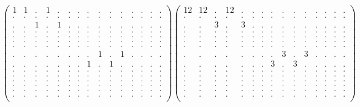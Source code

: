 \documentclass[12pt,a4paper]{amsart}
\begin{document}
\begin{align*}
\left(\begin{array}{rrrrrrrrrrrrrrr}%
1&1&.&1&.&.&.&.&.&.&.&.&.&.&.\\%
.&.&.&.&.&.&.&.&.&.&.&.&.&.&.\\%
.&.&1&.&1&.&.&.&.&.&.&.&.&.&.\\%
.&.&.&.&.&.&.&.&.&.&.&.&.&.&.\\%
.&.&.&.&.&.&.&.&.&.&.&.&.&.&.\\%
.&.&.&.&.&.&.&.&.&.&.&.&.&.&.\\%
.&.&.&.&.&.&.&.&.&.&.&.&.&.&.\\%
.&.&.&.&.&.&.&.&1&.&1&.&.&.&.\\%
.&.&.&.&.&.&.&1&.&1&.&.&.&.&.\\%
.&.&.&.&.&.&.&.&.&.&.&.&.&.&.\\%
.&.&.&.&.&.&.&.&.&.&.&.&.&.&.\\%
.&.&.&.&.&.&.&.&.&.&.&.&.&.&.\\%
.&.&.&.&.&.&.&.&.&.&.&.&.&.&.\\%
.&.&.&.&.&.&.&.&.&.&.&.&.&.&.\\%
.&.&.&.&.&.&.&.&.&.&.&.&.&.&.\\%
\end{array}\right)%
\left(\begin{array}{rrrrrrrrrrrrrrr}%
12&12&.&12&.&.&.&.&.&.&.&.&.&.&.\\%
.&.&.&.&.&.&.&.&.&.&.&.&.&.&.\\%
.&.&3&.&3&.&.&.&.&.&.&.&.&.&.\\%
.&.&.&.&.&.&.&.&.&.&.&.&.&.&.\\%
.&.&.&.&.&.&.&.&.&.&.&.&.&.&.\\%
.&.&.&.&.&.&.&.&.&.&.&.&.&.&.\\%
.&.&.&.&.&.&.&.&.&.&.&.&.&.&.\\%
.&.&.&.&.&.&.&.&3&.&3&.&.&.&.\\%
.&.&.&.&.&.&.&3&.&3&.&.&.&.&.\\%
.&.&.&.&.&.&.&.&.&.&.&.&.&.&.\\%
.&.&.&.&.&.&.&.&.&.&.&.&.&.&.\\%
.&.&.&.&.&.&.&.&.&.&.&.&.&.&.\\%
.&.&.&.&.&.&.&.&.&.&.&.&.&.&.\\%
.&.&.&.&.&.&.&.&.&.&.&.&.&.&.\\%
.&.&.&.&.&.&.&.&.&.&.&.&.&.&.\\%
\end{array}\right)%
\end{align*}
\end{document}
